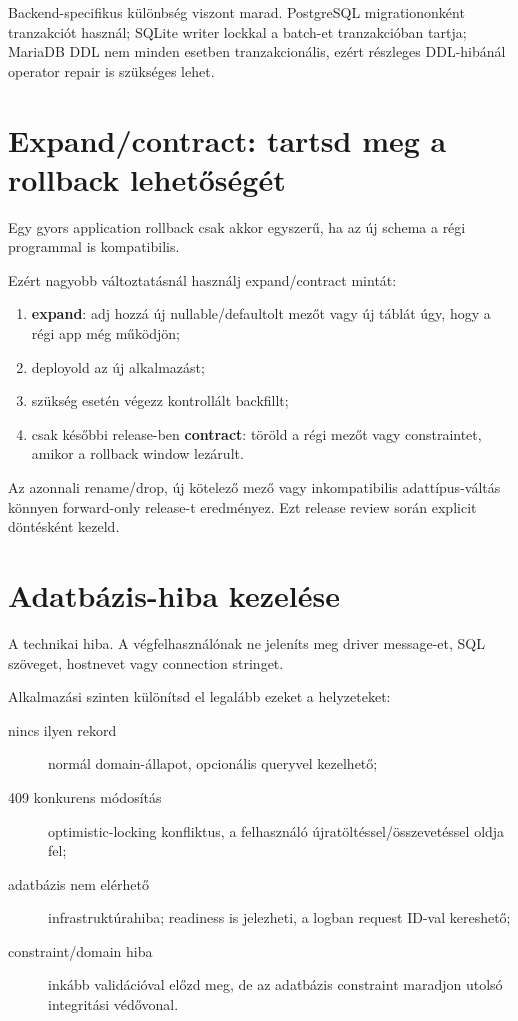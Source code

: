 Backend-specifikus különbség viszont marad. PostgreSQL migrationonként tranzakciót használ; SQLite  writer lockkal a batch-et tranzakcióban tartja; MariaDB DDL nem minden esetben tranzakcionális, ezért részleges DDL-hibánál operator repair is szükséges lehet.

\section{Expand/contract: tartsd meg a rollback lehetőségét}

Egy gyors application rollback csak akkor egyszerű, ha az új schema a régi programmal is kompatibilis.

Ezért nagyobb változtatásnál használj expand/contract mintát:

\begin{enumerate}
\item \textbf{expand}: adj hozzá új nullable/defaultolt mezőt vagy új táblát úgy, hogy a régi app még működjön;
\item deployold az új alkalmazást;
\item szükség esetén végezz kontrollált backfillt;
\item csak későbbi release-ben \textbf{contract}: töröld a régi mezőt vagy constraintet, amikor a rollback window lezárult.
\end{enumerate}

Az azonnali rename/drop, új kötelező mező vagy inkompatibilis adattípus-váltás könnyen forward-only release-t eredményez. Ezt release review során explicit döntésként kezeld.

\section{Adatbázis-hiba kezelése}

A  technikai hiba. A végfelhasználónak ne jeleníts meg driver message-et, SQL szöveget, hostnevet vagy connection stringet.

Alkalmazási szinten különítsd el legalább ezeket a helyzeteket:

\begin{description}
\item[nincs ilyen rekord] normál domain-állapot, opcionális queryvel kezelhető;
\item[409 konkurens módosítás] optimistic-locking konfliktus, a felhasználó újratöltéssel/összevetéssel oldja fel;
\item[adatbázis nem elérhető] infrastruktúrahiba; readiness is jelezheti, a logban request ID-val kereshető;
\item[constraint/domain hiba] inkább validációval előzd meg, de az adatbázis constraint maradjon utolsó integritási védővonal.
\end{description}

